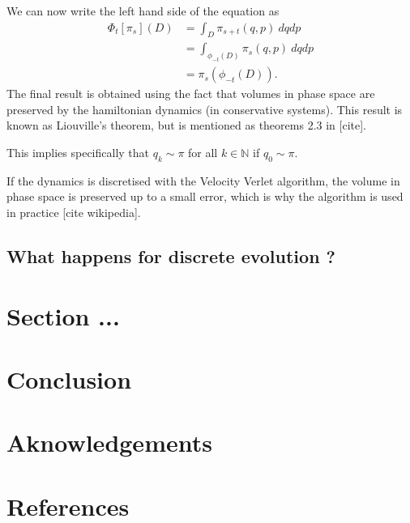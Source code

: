\documentclass[a4paper, 12pt,oneside]{article}
\begin{document}
		We can now write the left hand side of the equation as
		\begin{align}
			\Phi_t[\pi_s](D)&=\int_D \pi_{s+t}(q,p)\ dqdp \\
				&=\int_{\phi_{-t}(D)}\pi_{s}(q,p)\ dqdp \\
				&=\pi_s(\phi_{-t}(D)).
		\end{align}
		The final result is obtained using the fact that volumes in phase space are preserved by the hamiltonian dynamics (in conservative systems). This result is known as Liouville's theorem, but is mentioned as theorems 2.3 in [cite].

		This implies specifically that $q_k\sim\pi$ for all $k\in\mathbb{N}$ if $q_0\sim \pi$. 

		If the dynamics is discretised with the Velocity Verlet algorithm, the volume in phase space is preserved up to a small error, which is why the algorithm is used in practice [cite wikipedia]. 
        \subsection{What happens for discrete evolution ?}
	\section{Section ...}
	\section{Conclusion}
	\section*{Aknowledgements}
	\section*{References}
\end{document}
